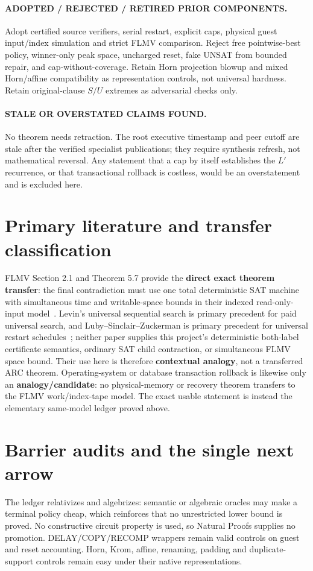 \documentclass[11pt]{article}
\begin{document}
\paragraph{ADOPTED / REJECTED / RETIRED PRIOR COMPONENTS.}
Adopt certified source verifiers, serial restart, explicit caps, physical
guest input/index simulation and strict FLMV comparison.  Reject free
pointwise-best policy, winner-only peak space, uncharged reset, fake UNSAT from
bounded repair, and cap-without-coverage.  Retain Horn projection blowup and
mixed Horn/affine compatibility as representation controls, not universal
hardness.  Retain original-clause $S/U$ extremes as adversarial checks only.

\paragraph{STALE OR OVERSTATED CLAIMS FOUND.}
No theorem needs retraction.  The root executive timestamp and peer cutoff are
stale after the verified specialist publications; they require synthesis
refresh, not mathematical reversal.  Any statement that a cap by itself
establishes the $L'$ recurrence, or that transactional rollback is costless,
would be an overstatement and is excluded here.

\section{Primary literature and transfer classification}
FLMV Section 2.1 and Theorem 5.7 provide the \textbf{direct exact theorem
transfer}: the final contradiction must use one total deterministic SAT
machine with simultaneous time and writable-space bounds in their indexed
read-only-input model~\cite{flmv}.  Levin's universal sequential search is
primary precedent for paid universal search, and Luby--Sinclair--Zuckerman is
primary precedent for universal restart schedules~\cite{levin,luby}; neither
paper supplies this project's deterministic both-label certificate semantics,
ordinary SAT child contraction, or simultaneous FLMV space bound.  Their use
here is therefore \textbf{contextual analogy}, not a transferred ARC theorem.
Operating-system or database transaction rollback is likewise only an
\textbf{analogy/candidate}: no physical-memory or recovery theorem transfers
to the FLMV work/index-tape model.  The exact usable statement is instead the
elementary same-model ledger proved above.

\section{Barrier audits and the single next arrow}
The ledger relativizes and algebrizes: semantic or algebraic oracles may make a
terminal policy cheap, which reinforces that no unrestricted lower bound is
proved.  No constructive circuit property is used, so Natural Proofs supplies
no promotion.  DELAY/COPY/RECOMP wrappers remain valid controls on guest and
reset accounting.  Horn, Krom, affine, renaming, padding and duplicate-support
controls remain easy under their native representations.
\end{document}
